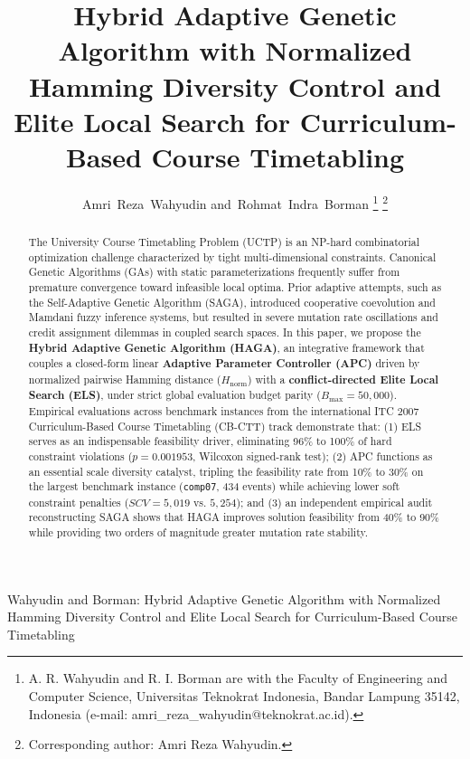 \documentclass[journal]{IEEEtran}
\begin{document}
\title{Hybrid Adaptive Genetic Algorithm with Normalized Hamming Diversity Control and Elite Local Search for Curriculum-Based Course Timetabling}

\author{Amri~Reza~Wahyudin
        and~Rohmat~Indra~Borman%
\thanks{A. R. Wahyudin and R. I. Borman are with the Faculty of Engineering and Computer Science, Universitas Teknokrat Indonesia, Bandar Lampung 35142, Indonesia (e-mail: amri\_reza\_wahyudin@teknokrat.ac.id).}%
\thanks{Corresponding author: Amri Reza Wahyudin.}%
}

%
{Wahyudin and Borman: Hybrid Adaptive Genetic Algorithm with Normalized Hamming Diversity Control and Elite Local Search for Curriculum-Based Course Timetabling}

\maketitle

\begin{abstract}
The University Course Timetabling Problem (UCTP) is an NP-hard combinatorial optimization challenge characterized by tight multi-dimensional constraints. Canonical Genetic Algorithms (GAs) with static parameterizations frequently suffer from premature convergence toward infeasible local optima. Prior adaptive attempts, such as the Self-Adaptive Genetic Algorithm (SAGA), introduced cooperative coevolution and Mamdani fuzzy inference systems, but resulted in severe mutation rate oscillations and credit assignment dilemmas in coupled search spaces. In this paper, we propose the \textbf{Hybrid Adaptive Genetic Algorithm (HAGA)}, an integrative framework that couples a closed-form linear \textbf{Adaptive Parameter Controller (APC)} driven by normalized pairwise Hamming distance ($H_{\text{norm}}$) with a \textbf{conflict-directed Elite Local Search (ELS)}, under strict global evaluation budget parity ($B_{\max} = 50,000$). Empirical evaluations across benchmark instances from the international ITC 2007 Curriculum-Based Course Timetabling (CB-CTT) track demonstrate that: (1) ELS serves as an indispensable feasibility driver, eliminating 96\% to 100\% of hard constraint violations ($p = 0.001953$, Wilcoxon signed-rank test); (2) APC functions as an essential scale diversity catalyst, tripling the feasibility rate from 10\% to 30\% on the largest benchmark instance (\texttt{comp07}, 434 events) while achieving lower soft constraint penalties ($SCV = 5,019$ vs. $5,254$); and (3) an independent empirical audit reconstructing SAGA shows that HAGA improves solution feasibility from 40\% to 90\% while providing two orders of magnitude greater mutation rate stability.
\end{abstract}
\end{document}
